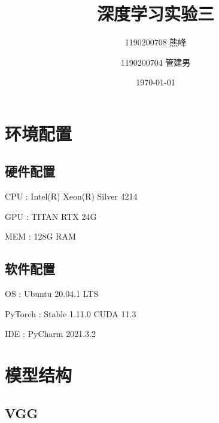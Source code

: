 \documentclass{article}
\title{深度学习实验三}
\author{
1190200708 熊峰\\
\and
1190200704 管建男\\
}
\date{\today}
\begin{document}
 
\maketitle 

\newpage
\tableofcontents
\newpage

\section{环境配置}
\subsection{硬件配置}
CPU : Intel(R) Xeon(R) Silver 4214 \par
GPU : TITAN RTX 24G \par
MEM : 128G RAM  \par
\subsection{软件配置}
OS : Ubuntu 20.04.1 LTS \par
PyTorch : Stable 1.11.0  CUDA 11.3 \par
IDE : PyCharm 2021.3.2 \par


\section{模型结构}
\subsection{VGG}
\end{document}
